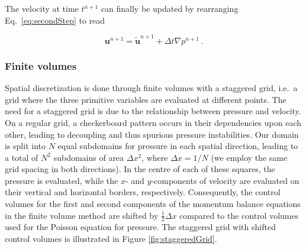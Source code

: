 \documentclass[final,3p,twocolumn]{elsarticle}
\begin{document}
The velocity at time $t^{n+1}$ can finally be updated by rearranging Eq.\
\eqref{eq:secondStep} to read 

\begin{equation}
    \bm{u}^{n+1} = \tilde{\bm{u}}^{n+1} + \Delta t \nabla p^{n+1} \,. 
    \label{eq:velocityUpdate}
\end{equation}

\subsubsection{Finite volumes}

Spatial discretization is done through finite volumes with a staggered grid,
i.e.\ a grid where the three primitive variables are evaluated at
different points.  The need for a staggered grid is due to the relationship
between pressure and velocity. On a regular grid, a checkerboard pattern occurs
in their dependencies upon each other, leading to decoupling and thus spurious
pressure instabilities.  Our domain is split into $N$ equal subdomains for
pressure in each spatial direction, leading to a total of $N^2$ subdomains of
area $\Delta x^2$, where $\Delta x = 1/N$ (we employ the same grid spacing in
both directions). In the centre of each of these squares, the pressure is
evaluated, while the $x$- and $y$-components of velocity are evaluated on their
vertical and horizontal borders, respectively.  Consequently, the control
volumes for the first and second components of the momentum balance equations
in the finite volume method are shifted by $\frac{1}{2} \Delta x$ compared to
the control volumes used for the Poisson equation for pressure. The staggered
grid with shifted control volumes is illustrated in Figure
\ref{fig:staggeredGrid}.
\end{document}

